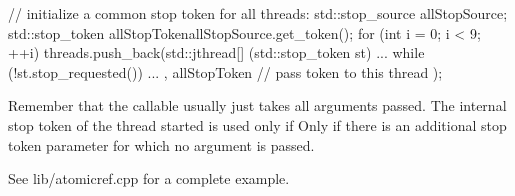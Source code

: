 \begin{cpp}
// initialize a common stop token for all threads:
std::stop_source allStopSource;
std::stop_token allStopToken{allStopSource.get_token()};
for (int i = 0; i < 9; ++i) {
	threads.push_back(std::jthread{[] (std::stop_token st) {
			...
			while (!st.stop_requested()) {
				...
			}
		},
		allStopToken // pass token to this thread
	});
}
\end{cpp}

Remember that the callable usually just takes all arguments passed. The internal stop token of the thread started is used only if Only if there is an additional stop token parameter for which no argument is passed.

See lib/atomicref.cpp for a complete example.












